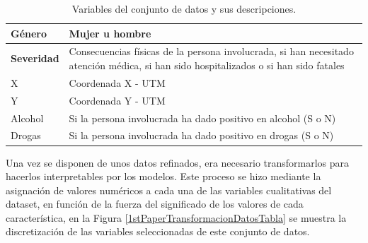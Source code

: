 \documentclass{uathesis-es}
\begin{document}
\begin{table}[H]
\begin{center}
\begin{tabular}{|p{3cm}|p{12cm}|}
			Género  & Mujer u hombre \\ \hline
			\textbf{Severidad}  & Consecuencias físicas de la persona involucrada, si han necesitado atención médica, si han sido hospitalizados o si han sido fatales \\ \hline
			X   & Coordenada X - UTM \\ \hline
			Y   & Coordenada Y - UTM \\ \hline
			Alcohol & Si la persona involucrada ha dado positivo en alcohol (S o N) \\ \hline
			Drogas & Si la persona involucrada ha dado positivo en drogas (S o N) \\ \hline \hline
		\end{tabular}
	\end{center}
	\caption{Variables del conjunto de datos y sus descripciones.}
	\label{Datadescription}
\end{table}

Una vez se disponen de unos datos refinados, era necesario transformarlos para hacerlos interpretables por los modelos. Este proceso se hizo mediante la asignación de valores numéricos a cada una de las variables cualitativas del dataset, en función de la fuerza del significado de los valores de cada característica, en la Figura \ref{1stPaperTransformacionDatosTabla} se muestra la discretización de las variables seleccionadas de este conjunto de datos.
\end{document}
